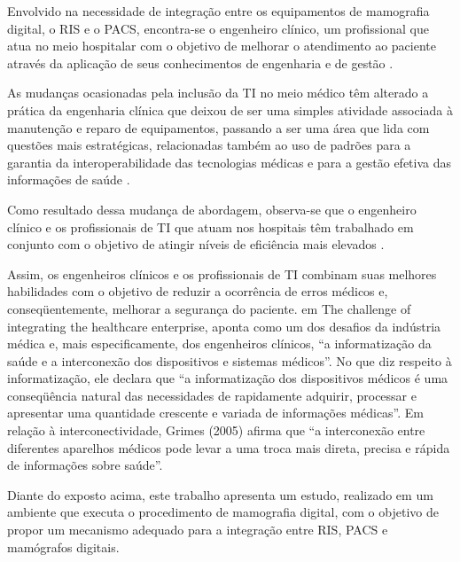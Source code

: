 Envolvido na necessidade de integração entre os equipamentos de mamografia digital,
o RIS e o PACS, encontra-se o engenheiro clínico, um profissional que atua no meio
hospitalar com o objetivo de melhorar o atendimento ao paciente através da aplicação de
seus conhecimentos de engenharia e de gestão \cite{acce1}.

As mudanças ocasionadas pela inclusão da TI no meio médico têm alterado a prática
da engenharia clínica que deixou de ser uma simples atividade associada à manutenção e
reparo de equipamentos, passando a ser uma área que lida com questões mais estratégicas,
relacionadas também ao uso de padrões para a garantia da interoperabilidade das
tecnologias médicas e para a gestão efetiva das informações de saúde \cite{acce2}.

Como resultado dessa mudança de abordagem, observa-se que o engenheiro clínico e
os profissionais de TI que atuam nos hospitais têm trabalhado em conjunto com o objetivo
de atingir níveis de eficiência mais elevados \cite{acce2}.

Assim, os engenheiros clínicos e os profissionais de TI combinam suas melhores
habilidades com o objetivo de reduzir a ocorrência de erros médicos e, conseqüentemente,
melhorar a segurança do paciente.
\cite{grimes} em The challenge of integrating the
healthcare enterprise, aponta como um dos desafios da indústria médica e, mais
especificamente, dos engenheiros clínicos, “a informatização da saúde e a interconexão dos
dispositivos e sistemas médicos”. No que diz respeito à informatização, ele declara que “a
informatização dos dispositivos médicos é uma conseqüência natural das necessidades de
rapidamente adquirir, processar e apresentar uma quantidade crescente e variada de
informações médicas”. Em relação à interconectividade, Grimes (2005) afirma que “a
interconexão entre diferentes aparelhos médicos pode levar a uma troca mais direta,
precisa e rápida de informações sobre saúde”.

Diante do exposto acima, este trabalho apresenta um estudo, realizado em um
ambiente que executa o procedimento de mamografia digital, com o objetivo de propor um
mecanismo adequado para a integração entre RIS, PACS e mamógrafos digitais.